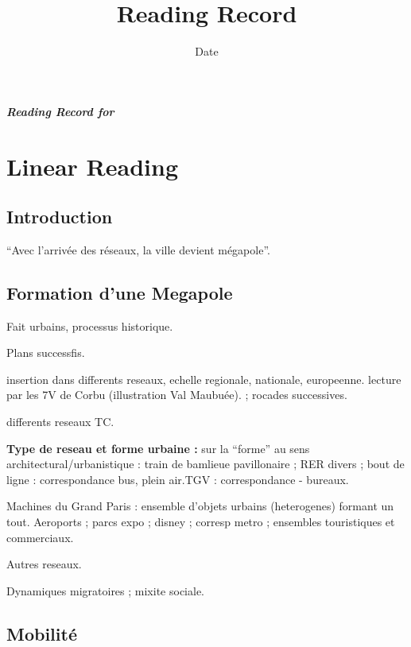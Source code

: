 


\title{Reading Record\bigskip\\
\cite{}
}
\author{}
\date{Date}


\maketitle

\textbf{\textit{Reading Record for \cite{}}}




\section{Linear Reading}


\subsection*{Introduction}

``Avec l'arrivée des réseaux, la ville devient mégapole''.

\subsection{Formation d'une Megapole}

Fait urbains, processus historique.

Plans successfis.

insertion dans differents reseaux, echelle regionale, nationale, europeenne. lecture par les 7V de Corbu (illustration Val Maubuée). ; rocades successives.

differents reseaux TC.

\textbf{Type de reseau et forme urbaine :} sur la ``forme'' au sens architectural/urbanistique : train de bamlieue pavillonaire ; RER divers ; bout de ligne : correspondance bus, plein air.TGV : correspondance - bureaux.

Machines du Grand Paris : ensemble d'objets urbains (heterogenes) formant un tout. Aeroports ; parcs expo ; disney ; corresp metro ; ensembles touristiques et commerciaux.

Autres reseaux.

Dynamiques migratoires ; mixite sociale.


\subsection*{Mobilité}





















